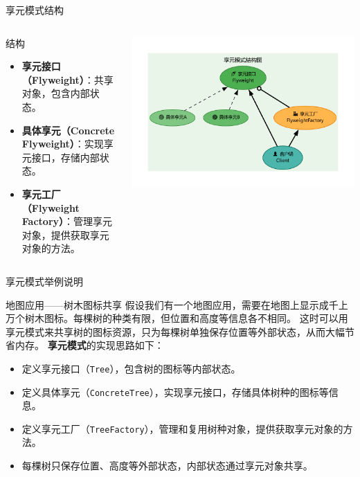\documentclass[UTF8,aspectratio=169]{beamer}
\begin{document}
\begin{frame}{享元模式结构}
    \begin{columns}
        \begin{column}{0.38\textwidth}
            \begin{ytublock}{结构}
                \begin{itemize}
                    \item \textbf{享元接口（Flyweight）}：共享对象，包含内部状态。
                    \item \textbf{具体享元（Concrete Flyweight）}：实现享元接口，存储内部状态。
                    \item \textbf{享元工厂（Flyweight Factory）}：管理享元对象，提供获取享元对象的方法。
                \end{itemize}
            \end{ytublock}
        \end{column}
        \begin{column}{0.58\textwidth}
            \includegraphics[width=1.0\textwidth]{images/flyweight_pattern.pdf}
        \end{column}
    \end{columns}
\end{frame}

\begin{frame}{享元模式举例说明}
    \begin{exampleytublock}{地图应用——树木图标共享}
        假设我们有一个地图应用，需要在地图上显示成千上万个树木图标。每棵树的种类有限，但位置和高度等信息各不相同。
        这时可以用享元模式来共享树的图标资源，只为每棵树单独保存位置等外部状态，从而大幅节省内存。
        \textbf{享元模式}的实现思路如下：
        \begin{itemize}
            \item 定义享元接口（\texttt{Tree}），包含树的图标等内部状态。
            \item 定义具体享元（\texttt{ConcreteTree}），实现享元接口，存储具体树种的图标等信息。
            \item 定义享元工厂（\texttt{TreeFactory}），管理和复用树种对象，提供获取享元对象的方法。
            \item 每棵树只保存位置、高度等外部状态，内部状态通过享元对象共享。
        \end{itemize}
    \end{exampleytublock}
\end{frame}
\end{document}
